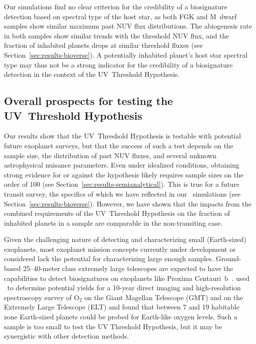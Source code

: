 \documentclass[twocolumn,twocolappendix,linenumbers]{aastex631}
\begin{document}
Our simulations find no clear criterion for the credibility of a biosignature detection based on spectral type of the host star, as both FGK and M~dwarf samples show similar maximum past \gls{NUV} flux distributions.
The abiogenesis rate in both samples show similar trends with the threshold \gls{NUV} flux, and the fraction of inhabited planets drops at similar threshold fluxes (see Section~\ref{sec:results-bioverse}).
A potentially inhabited planet's host star spectral type may thus not be a strong indicator for the credibility of a biosignature detection in the context of the UV~Threshold Hypothesis.

\subsection{Overall prospects for testing the UV~Threshold Hypothesis} %
Our results show that the UV~Threshold Hypothesis is testable with potential future exoplanet surveys, but that the success of such a test depends on the sample size, the distribution of past \gls{NUV} fluxes, and several unknown astrophysical nuisance parameters.
Even under idealized conditions, obtaining strong evidence for or against the hypothesis likely requires sample sizes on the order of 100 (see Section~\ref{sec:results-semianalytical}).
This is true for a future transit survey, the specifics of which we have reflected in our \bioverse\ simulations (see Section~\ref{sec:results-bioverse}).
However, we have shown that the impacts from the combined requirements of the UV~Threshold Hypothesis on the fraction of inhabited planets in a sample are comparable in the non-transiting case.


Given the challenging nature of detecting and characterizing small (Earth-sized) exoplanets, most exoplanet mission concepts currently under development or considered lack the potential for characterizing large enough samples.
Ground-based 25--40-meter class extremely large telescopes are expected to have the capabilities to detect biosignatures on exoplanets like Proxima Centauri~b~\citep[e.g.,][]{Wang2017,Hawker2019,Zhang2024,Vaughan2024}.
\citet{Hardegree-Ullman2024} used \bioverse\ to determine potential yields for a 10-year direct imaging and high-resolution spectroscopy survey of O$_2$ on the Giant Magellan Telescope (GMT) and on the Extremely Large Telescope (ELT) and found that between 7 and 19 habitable zone Earth-sized planets could be probed for Earth-like oxygen levels.
Such a sample is too small to test the UV Threshold Hypothesis, but it may be synergistic with other detection methods.
\end{document}
